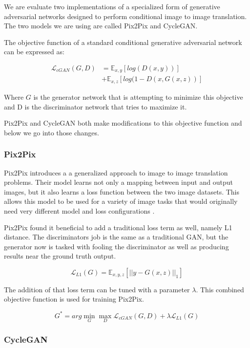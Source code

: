 \documentclass[twocolumn]{article}
\begin{document}
	We are evaluate two implementations of a specialized form of generative adversarial networks designed to perform conditional image to image translation. The two models we are using are called Pix2Pix and CycleGAN.
	
	The objective function of a standard conditional generative adversarial network can be expressed as:
	
	\begin{align*}
		\mathcal{L}_{cGAN}(G, D) &= \mathbb{E}_{x,y}[log(D(x, y))] \\
		&+ \mathbb{E}_{x,z}[log(1 - D(x, G(x, z))]
	\end{align*}
	
	Where $G$ is the generator network that is attempting to minimize this objective and D is the discriminator network that tries to maximize it.

	Pix2Pix and CycleGAN both make modifications to this objective function and below we go into those changes.	
	
	\subsubsection{Pix2Pix}	
	
	Pix2Pix introduces a a generalized approach to image to image translation problems.  Their model learns not only a mapping between input and output images, but it also learns a loss function between the two image datasets. This allows this model to be used for a variety of image tasks that would originally need very different model and loss configurations \cite{isola2016imagetoimage}.
	
	Pix2Pix found it beneficial to add a traditional loss term as well, namely L1 distance. The discriminators job is the same as a traditional GAN, but the generator now is tasked with fooling the discriminator as well as producing results near the ground truth output.
	
	$$
		\mathcal{L}_{L1}(G) = \mathbb{E}_{x,y,z}[|| y - G(x, z) ||_1]		
	$$

	The addition of that loss term can be tuned with a parameter  $\lambda$. This combined objective function is used for training Pix2Pix.
	
	$$	
		G^* = arg \mathop{min}_G \mathop{max}_D \mathcal{L}_{cGAN}(G, D) + \lambda \mathcal{L}_{L1}(G)
	$$
	
	\subsubsection{CycleGAN}
	
\end{document}
